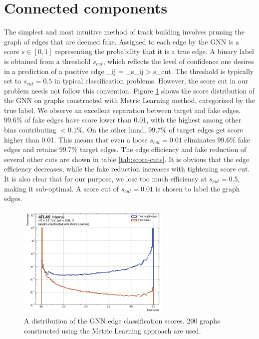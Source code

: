 \section{Connected components}
\label{sect:cc}
The simplest and most intuitive method of track building involves pruning the graph of edges that are deemed fake.
Assigned to each edge by the GNN is a score $s\in [0,1]$ representing the probability that it is a true edge. 
A binary label is obtained from a threshold $s_{cut}$, which reflects the level of confidence one desires in a prediction of a positive edge
\beq
\label{eq:11.1}
_{ij} = _{s_{ij} > s_{cut}}.
\eeq
The threshold is typically set to $s_{cut}=0.5$ in typical classification problems.
However, the score cut in our problem needs not follow this convention.
Figure \ref{fig:gnn-edge-score} shows the score distribution of the GNN on graphs constructed with Metric Learning method, categorized by the true label.
We observe an excellent separation between target and fake edges. 
$99.6\%$ of fake edges have score lower than 0.01, with the highest among other bins contributing $<0.1\%$. 
On the other hand, $99.7\%$ of target edges get score higher than 0.01. 
This means that even a loose $s_{cut}=0.01$ eliminates $99.6\%$ fake edges and retains $99.7\%$ target edges. 
The edge efficiency and fake reduction of several other cuts are shown in table \ref{tab:score-cuts}.
It is obvious that the edge efficiency decreases, while the fake reduction increases with tightening score cut.
It is also clear that for our purpose, we lose too much efficiency at $s_{cut}=0.5$, making it sub-optimal. 
A score cut of $s_{cut}=0.01$ is chosen to label the graph edges. 
\begin{figure}[h!]
    \centering
    \includegraphics[width=0.65\textwidth]{figures/gnn/gnn-edge-score.png}
    \caption{A distribution of the GNN edge classification scores. 200 graphs constructed using the Metric Learning approach are used.}
    \label{fig:gnn-edge-score}
\end{figure}


